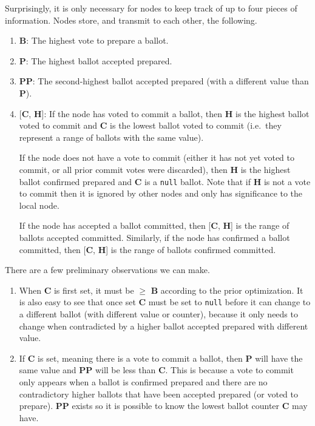 \begin{enumerate}
    Surprisingly, it is only necessary for nodes to keep track of up to four pieces of information. Nodes store, and transmit to each other, the following.
    \begin{enumerate}
        \item \textbf{B}: The highest vote to prepare a ballot.

        \item \textbf{P}: The highest ballot accepted prepared.

        \item \textbf{PP}: The second-highest ballot accepted prepared (with a different value than \textbf{P}).

        \item {[\textbf{C}, \textbf{H}]}: If the node has voted to commit a ballot, then \textbf{H} is the highest ballot voted to commit and \textbf{C} is the lowest ballot voted to commit (i.e.\ they represent a range of ballots with the same value).
        
        If the node does not have a vote to commit (either it has not yet voted to commit, or all prior commit votes were discarded), then \textbf{H} is the highest ballot confirmed prepared and \textbf{C} is a {\tt null} ballot. Note that if \textbf{H} is not a vote to commit then it is ignored by other nodes and only has significance to the local node.

        If the node has accepted a ballot committed, then [\textbf{C}, \textbf{H}] is the range of ballots accepted committed. Similarly, if the node has confirmed a ballot committed, then [\textbf{C}, \textbf{H}] is the range of ballots confirmed committed.
    \end{enumerate}

    There are a few preliminary observations we can make.
    \begin{enumerate}
        \item When \textbf{C} is first set, it must be $\geq$ \textbf{B} according to the prior optimization. It is also easy to see that once set \textbf{C} must be set to {\tt null} before it can change to a different ballot (with different value or counter), because it only needs to change when contradicted by a higher ballot accepted prepared with different value.

        \item If \textbf{C} is set, meaning there is a vote to commit a ballot, then \textbf{P} will have the same value and \textbf{PP} will be less than \textbf{C}. This is because a vote to commit only appears when a ballot is confirmed prepared and there are no contradictory higher ballots that have been accepted prepared (or voted to prepare). \textbf{PP} exists so it is possible to know the lowest ballot counter \textbf{C} may have.


\end{enumerate}
\end{enumerate}
